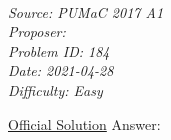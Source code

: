 \SSbreak\\
\emph{Source: PUMaC 2017 A1}\\
\emph{Proposer: \Pchan}\\ %
\emph{Problem ID: 184}\\
\emph{Date: 2021-04-28}\\
\emph{Difficulty: Easy}\\
\SSbreak

\bigskip

\begin{solution}\hfil\medskip
	
	\href{https://static1.squarespace.com/static/570450471d07c094a39efaed/t/5a1784b6e4966b1342975a24/1511490742989/PUMaC2017_Algebra_A_Solutions.pdf}{Official Solution} Answer: 
\end{solution}\bigskip
